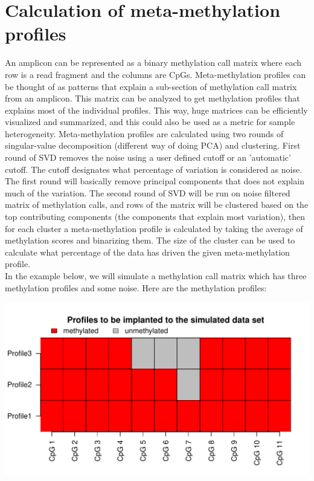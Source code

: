 \documentclass{article}\usepackage[]{graphicx}\usepackage[]{color}
\newenvironment{knitrout}{}{} %
\begin{document}
\section{Calculation of meta-methylation profiles}
An amplicon can be represented as a binary methylation
call matrix where each row is a read fragment and the columns are CpGs.
Meta-methylation profiles can be thought of as patterns that explain a sub-section of 
methylation call matrix from an amplicon.  This matrix can be
analyzed to get methylation profiles that explains most of the individual profiles. This
way, huge matrices can be efficiently visualized and summarized, and this could also be
used as a metric for sample heterogeneity.
Meta-methylation profiles are calculated 
using two rounds of singular-value decomposition (different way of doing PCA) and clustering. 
First round of SVD removes the noise
using a user defined cutoff or an 'automatic' cutoff. The cutoff designates what percentage
of variation is considered as noise. The first round will basically remove principal components
that does not explain much of the variation. The second round of SVD will be run on noise
filtered matrix of methylation calls, and rows of the matrix will be clustered based
on the top contributing components (the components that explain most variation),
then for each cluster a meta-methylation profile is calculated by taking the average of 
methylation scores and binarizing them. The size of the cluster can be used
to calculate what percentage of the data has driven the given meta-methylation profile.
\\ 
In the example below, we will simulate a methylation call matrix which has three methylation
profiles and some noise. Here are the methylation profiles:
\begin{knitrout}
\color{fgcolor}

{\centering \includegraphics[width=.9\linewidth]{figure/manual-metaImplant} 

}



\end{knitrout}
\end{document}
